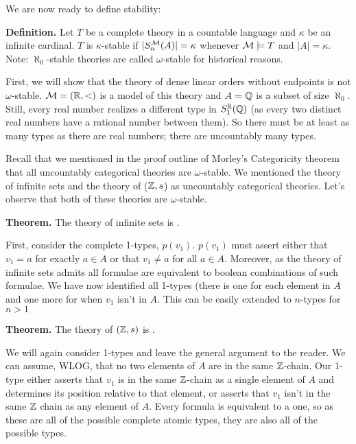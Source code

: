 We are now ready to define stability: 

\textbf{Definition.} Let \(T\) be a complete theory in a countable language and \(\kappa\) be an infinite cardinal. \(T\) is \(\kappa\)-stable if \(|S_n^{\mathcal{M}}(A)| = \kappa\) whenever \(\mathcal{M} \models T\) and \(|A| = \kappa\). Note: \(\aleph_0\)-stable theories are called \(\omega\)-stable for historical reasons. 

First, we will show that the theory of dense linear orders without endpoints is not \(\omega\)-stable. \(\mathcal{M} = (\mathbb{R}, <)\) is a model of this theory and \(A = \mathbb{Q}\) is a subset of size \(\aleph_0\). Still, every real number realizes a different type in \(S_1^{\mathbb{R}}(\mathbb{Q})\) (as every two distinct real numbers have a rational number between them). So there must be at least as many types as there are real numbers; there are uncountably many types.  

Recall that we mentioned in the proof outline of Morley's Categoricity theorem that all uncountably categorical theories are \(\omega\)-stable. We mentioned the theory of infinite sets and the theory of (\(\mathbb{Z}, s\)) as uncountably categorical theories. Let's observe that both of these theories are \(\omega\)-stable. 


\textbf{Theorem.} The theory of infinite sets is \omst. 

First, consider the complete 1-types, \(p(v_1)\). \(p(v_1)\) must assert either that \(v_1 = a\) for exactly \(a \in A\) or that \(v_1 \neq a\) for all \(a \in A\). Moreover, as the theory of infinite sets admits \qe all formulae are equivalent to boolean combinations of such formulae. We have now identified all 1-types (there is one for each element in \(A\) and one more for when \(v_1\) isn't in \(A\). This can be easily extended to \(n\)-types for \(n > 1\)

\textbf{Theorem.} The theory of \((\mathbb{Z}, s)\) is \omst. 

We will again consider 1-types and leave the general argument to the reader. We can assume, WLOG, that no two elements of \(A\) are in the same \(\mathbb{Z}\)-chain. Our 1-type either asserts that \(v_1\) is in the same \(\mathbb{Z}\)-chain as a single element of \(A\) and determines its position relative to that element, or asserts that \(v_1\) isn't in the same \(\mathbb{Z}\) chain as any element of \(A\). Every formula is equivalent to a \qf one, so as these are all of the possible complete atomic types, they are also all of the possible types.    

